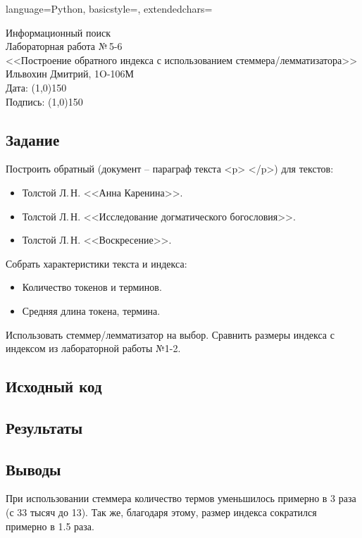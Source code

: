 \documentclass[12pt]{article}
\newcommand{\StudentName}{Ильвохин Дмитрий}
\newcommand{\Group}{1O-106М}
\newcommand{\CourseName}{Информационный поиск}
\newcommand{\LabNum}{5-6}
\newcommand{\Subject}{Построение обратного индекса с использованием стеммера/лемматизатора}
\begin{document}
\lstset
{
        language=Python,
        basicstyle=\scriptsize,%
        extendedchars=\true
}

\begin{flushright}
\Large{
	\CourseName \\
	Лабораторная работа №\,\LabNum \\
	<<\Subject>> \\
  \StudentName, \Group \\
  Дата: \line(1,0){150} \\
  Подпись: \line(1,0){150} \\
}
\end{flushright}

\subsection*{Задание}
Построить обратный (документ -- параграф текста <p> </p>) для текстов:
\begin{itemize}
  \item Толстой Л.\,Н. <<Анна Каренина>>.
  \item Толстой Л.\,Н. <<Исследование догматического богословия>>.
  \item Толстой Л.\,Н. <<Воскресение>>.
\end{itemize}

Собрать характеристики текста и индекса:
\begin{itemize}
  \item Количество токенов и терминов.
  \item Средняя длина токена, термина.
\end{itemize}

Использовать стеммер/лемматизатор на выбор.
Сравнить размеры индекса с индексом из лабораторной работы №1-2.


\subsection*{Исходный код}


\subsection*{Результаты}


\subsection*{Выводы}
При использовании стеммера количество термов уменьшилось примерно в 3 раза (с 33 тысяч до 13).
Так же, благодаря этому, размер индекса сократился примерно в 1.5 раза.
\end{document}
